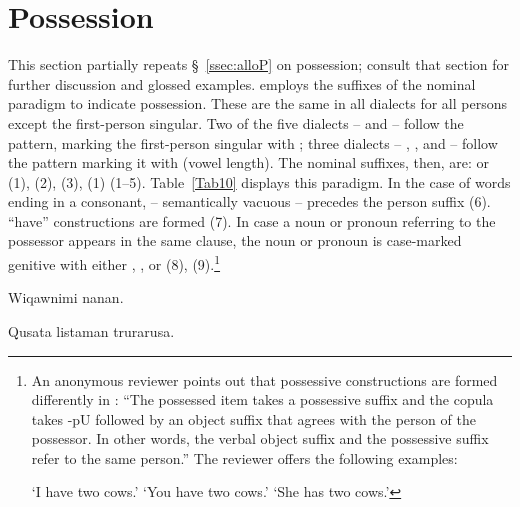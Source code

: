 \section{Possession}
This section partially repeats \S~\ref{ssec:alloP} on possession; consult that section for further discussion and glossed examples. \SYQ{} employs the suffixes of the nominal paradigm to indicate possession. These are the same in all dialects for all persons except the first-person singular. Two of the five dialects -- \AMV{} and \LT{} -- follow the \QII{} pattern, marking the first-person singular with ; three dialects -- \ACH{}, \CH{}, and \SP{} -- follow the \QI{} pattern marking it with \phono{-:} (vowel length). The \SYQ{} nominal suffixes, then, are:  or \phono{-:} (1),  (2),  (3),  (1) (1--5). Table~\ref{Tab10} displays this paradigm. In the case of words ending in a consonant,  -- semantically vacuous -- precedes the person suffix (6). \SYQ{} ``have'' constructions are formed   (7). In case a noun or pronoun referring to the possessor appears in the same clause, the noun or pronoun is case-marked genitive with either , , or  (8), (9).\footnote{An anonymous reviewer points out that possessive constructions are formed differently in \QI{}: ``The possessed item takes a possessive suffix and the copula takes -pU followed by an object suffix that agrees with the person of the possessor. In other words, the verbal object suffix and the possessive suffix refer to the same person.'' The reviewer offers the following examples:

     `I have two cows.'
    `You have two cows.'
    `She has two cows.'}

%
{Wiqawnimi nanan.}%
{}%
{}{}%

%
{Qusa\pb{:}ta listaman trurarusa.}%
{}%
{}{}%

